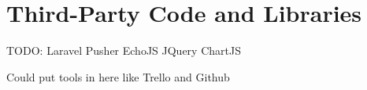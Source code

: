\chapter{Third-Party Code and Libraries}
TODO:
Laravel
Pusher
EchoJS
JQuery
ChartJS

Could put tools in here like Trello and Github